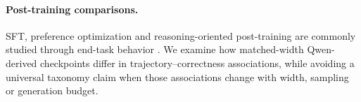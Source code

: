 \paragraph{Post-training comparisons.}
SFT, preference optimization and reasoning-oriented post-training are commonly
studied through end-task behavior \citep{wei-etal-2022-finetuned,
ouyang-etal-2022-training,rafailov-etal-2023-dpo,deepseek-r1-2025}.  We examine
how matched-width Qwen-derived checkpoints differ in trajectory--correctness
associations, while avoiding a universal taxonomy claim when those associations
change with width, sampling or generation budget.
